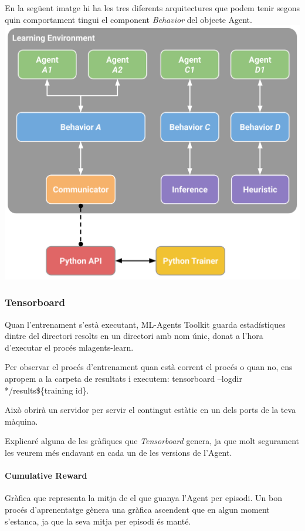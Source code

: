 \documentclass{article}
\begin{document}
    En la següent imatge hi ha les tres diferents arquitectures que podem tenir segons quin comportament tingui el component \textit{Behavior} del objecte Agent. \\
    
    \includegraphics[width=\textwidth]{images/arquitecture_mlagent.png}
    
    \newpage
    
    \subsubsection{Tensorboard}
    Quan l'entrenament s'està executant, ML-Agents Toolkit guarda estadístiques dintre del directori resolts en un directori amb nom únic, donat a l'hora d'executar el procés mlagents-learn.

    Per observar el procés d'entrenament quan està corrent el procés o quan no, ens apropem a la carpeta de resultats i executem: tensorboard –logdir */results\$\{training id\}.
    
    Això obrirà un servidor per servir el contingut estàtic en un dels ports de la teva màquina.
    
    Explicaré alguna de les gràfiques que \textit{Tensorboard} genera, ja que molt segurament les veurem més endavant en cada un de les versions de l'Agent.
    
    \paragraph{Cumulative Reward}
    Gràfica que representa la mitja de el que guanya l'Agent per episodi. Un bon procés d'aprenentatge gènera una gràfica ascendent que en algun moment s'estanca, ja que la seva mitja per episodi és manté.
    
\end{document}
